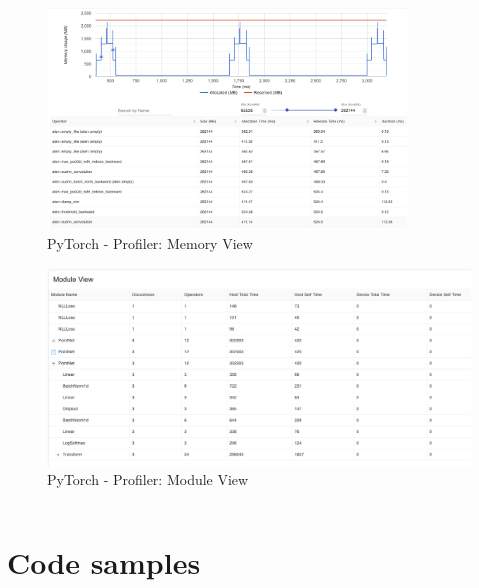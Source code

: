 \documentclass[12pt, a4paper, hidelinks]{article}
\begin{document}
\begin{figure}[H]
\centering
\includegraphics[width=0.85\textwidth]{./assets/scap_gtx1080_profiler-torch_batch-size-64_14650758_memory-view}
\caption[PyTorch - Profiler: Memory View]{PyTorch - Profiler: Memory View}
\label{fig:scap_gtx1080_profiler-torch_batch-size-64_14650758_memory-view}
\end{figure}

\begin{figure}[H]
\centering
\includegraphics[width=1\textwidth]{./assets/scap_gtx1080_profiler-torch_batch-size-64_14650758_module-view}
\caption[PyTorch - Profiler: Module View]{PyTorch - Profiler: Module View}
\label{fig:scap_gtx1080_profiler-torch_batch-size-64_14650758_module-view}
\end{figure}

\inputminted[xleftmargin=1em,linenos,fontsize=\small, breaklines]{python}{./assets/scap_gtx1080_deepspeed_14615344_4294967294_one-epoch.txt}

\section{Code samples}
\end{document}

